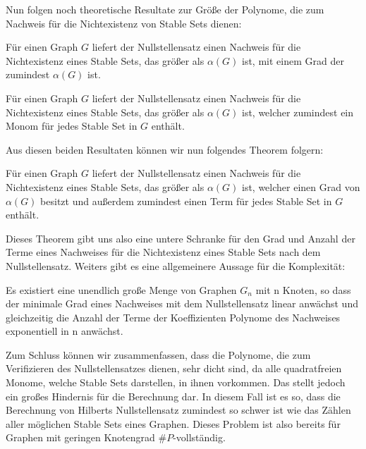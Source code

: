 \noindent Nun folgen noch theoretische Resultate zur Größe der Polynome, die zum Nachweis für die Nichtexistenz von Stable Sets dienen:

\begin{theorem}
Für einen Graph $G$ liefert der Nullstellensatz einen Nachweis für die Nichtexistenz eines Stable Sets, das größer als $\alpha(G)$ ist, mit einem Grad der zumindest $\alpha(G)$ ist.
\end{theorem}

\begin{corollary}
Für einen Graph $G$ liefert der Nullstellensatz einen Nachweis für die Nichtexistenz eines Stable Sets, das größer als $\alpha(G)$ ist, welcher zumindest ein Monom für jedes Stable Set in $G$ enthält.
\end{corollary}

\noindent Aus diesen beiden Resultaten können wir nun folgendes Theorem folgern:

\begin{theorem}
Für einen Graph $G$ liefert der Nullstellensatz einen Nachweis für die Nichtexistenz eines Stable Sets, das größer als $\alpha(G)$ ist, welcher einen Grad von $\alpha(G)$ besitzt und außerdem zumindest einen Term für jedes Stable Set in $G$ enthält.
\end{theorem}

\noindent Dieses Theorem gibt uns also eine untere Schranke für den Grad und Anzahl der Terme eines Nachweises für die Nichtexistenz eines Stable Sets nach dem Nullstellensatz. Weiters gibt es eine allgemeinere Aussage für die Komplexität:

\begin{corollary}
Es existiert eine unendlich große Menge von Graphen $G_n$ mit n Knoten, so dass der minimale Grad eines Nachweises mit dem Nullstellensatz linear anwächst und gleichzeitig die Anzahl der Terme der Koeffizienten Polynome des Nachweises exponentiell in n anwächst.
\end{corollary}


\noindent Zum Schluss können wir zusammenfassen, dass die Polynome, die zum Verifizieren des Nullstellensatzes dienen, sehr dicht sind, da alle quadratfreien Monome, welche Stable Sets darstellen, in ihnen vorkommen.
Das stellt jedoch ein großes Hindernis für die Berechnung dar. In diesem Fall ist es so, dass die Berechnung von Hilberts Nullstellensatz zumindest so schwer ist wie das Zählen aller möglichen Stable Sets eines Graphen. Dieses Problem ist also bereits für Graphen mit geringen Knotengrad $\#P$-vollständig. 




